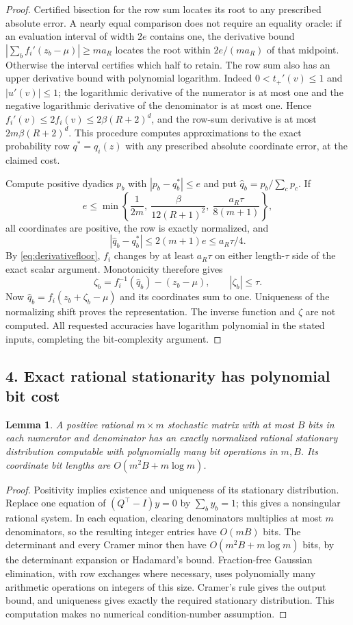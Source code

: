 \documentclass[11pt]{article}
\newtheorem{lemma}[theorem]{Lemma}
\begin{document}
\begin{proof}
Certified bisection for the row sum locates its root to any prescribed
absolute error.  A nearly equal comparison does not require an
equality oracle: if an evaluation interval of width $2e$ contains one,
the derivative bound $|\sum_bf_i'(z_b-\mu)|\geq ma_R$ locates the
root within $2e/(ma_R)$ of that midpoint.  Otherwise the interval
certifies which half to retain.  The row sum also has an upper
derivative bound with polynomial logarithm.  Indeed $0<t_+'(v)\leq1$
and $|u'(v)|\leq1$; the logarithmic derivative of the numerator is
at most one and the negative logarithmic derivative of the denominator
is at most one.  Hence $f_i'(v)\leq2f_i(v)\leq2\beta(R+2)^d$,
and the row-sum derivative is at most $2m\beta(R+2)^d$.
This procedure computes approximations to the exact probability row
$q^*=q_i(z)$ with any prescribed absolute coordinate error, at the
claimed cost.

Compute positive dyadics $p_b$ with $|p_b-q_b^*|\leq e$ and put
$\widehat q_b=p_b/\sum_cp_c$.  If
\[
 e\leq\min\left\{\frac1{2m},\
 \frac{\beta}{12(R+1)^2},\
 \frac{a_R\tau}{8(m+1)}\right\},
\]
all coordinates are positive, the row is exactly normalized, and
\[
 |\widehat q_b-q_b^*|\leq2(m+1)e\leq a_R\tau/4.
\]
By \eqref{eq:derivativefloor}, $f_i$ changes by at least $a_R\tau$
on either length-$\tau$ side of the exact scalar argument.
Monotonicity therefore gives
\[
 \zeta_b=f_i^{-1}(\widehat q_b)-(z_b-\mu),\qquad
 |\zeta_b|\leq\tau.
\]
Now $\widehat q_b=f_i(z_b+\zeta_b-\mu)$ and its coordinates sum
to one.  Uniqueness of the normalizing shift proves the representation.
The inverse function and $\zeta$ are not computed.  All requested
accuracies have logarithm polynomial in the stated inputs, completing
the bit-complexity argument.
\end{proof}

\subsection*{4. Exact rational stationarity has polynomial bit cost}
\begin{lemma}\label{lem:stationarity}
A positive rational $m\times m$ stochastic matrix with at most $B$
bits in each numerator and denominator has an exactly normalized
rational stationary distribution computable with polynomially many
bit operations in $m,B$.  Its coordinate bit lengths are
$O(m^2B+m\log m)$.
\end{lemma}
\begin{proof}
Positivity implies existence and uniqueness of its stationary
distribution.  Replace one equation of $(Q^\top-I)y=0$ by
$\sum_by_b=1$; this gives a nonsingular rational system.  In each
equation, clearing denominators multiplies at most $m$ denominators,
so the resulting integer entries have $O(mB)$ bits.  The determinant
and every Cramer minor then have $O(m^2B+m\log m)$ bits, by the
determinant expansion or Hadamard's bound.  Fraction-free Gaussian
elimination, with row exchanges where necessary, uses polynomially
many arithmetic operations on integers of this size.  Cramer's rule
gives the output bound, and uniqueness gives exactly the required
stationary distribution.  This computation makes no numerical
condition-number assumption.
\end{proof}
\end{document}
